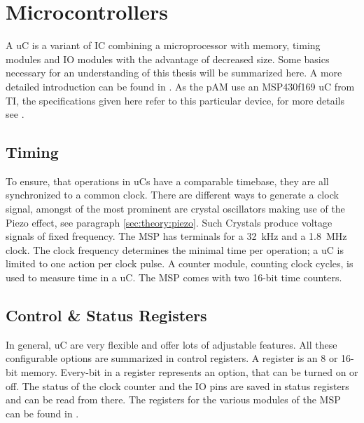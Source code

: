\section{Microcontrollers}
A \ac{uC} is a variant of \ac{IC} combining a microprocessor with memory, timing modules and \acs{IO} modules with the advantage of decreased size. Some basics necessary for an understanding of this thesis will be summarized here. A more detailed introduction can be found in \cite{Microcontrollers}. As the \ac{pAM} use an MSP430f169 \ac{uC} from \ac{TI}, the specifications given here refer to this particular device, for more details see \cite{msp_manual}.

\subsection{Timing}
To ensure, that operations in \acp{uC} have a comparable timebase, they are all synchronized to a common clock. There are different ways to generate a clock signal, amongst of the most prominent are crystal oscillators making use of the Piezo effect, see paragraph \ref{sec:theory:piezo}. Such Crystals produce voltage signals of fixed frequency. The MSP has terminals for a \SI{32}{\kilo\hertz} and a \SI{1.8}{\mega\hertz} clock. The clock frequency determines the minimal time per operation; a \ac{uC} is limited to one action per clock pulse.
A counter module, counting clock cycles, is used to measure time in a \ac{uC}. The MSP comes with two 16-bit time counters.
\subsection{Control \& Status Registers}
In general, \ac{uC} are very flexible and offer lots of adjustable features. All these configurable options are summarized in control registers. A register is an 8 or 16-bit memory. Every-bit in a register represents an option, that can be turned on or off. 
The status of the clock counter and the \ac{IO} pins are saved in status registers and can be read from there. The registers for the various modules of the MSP can be found in \cite{msp_manual}.
